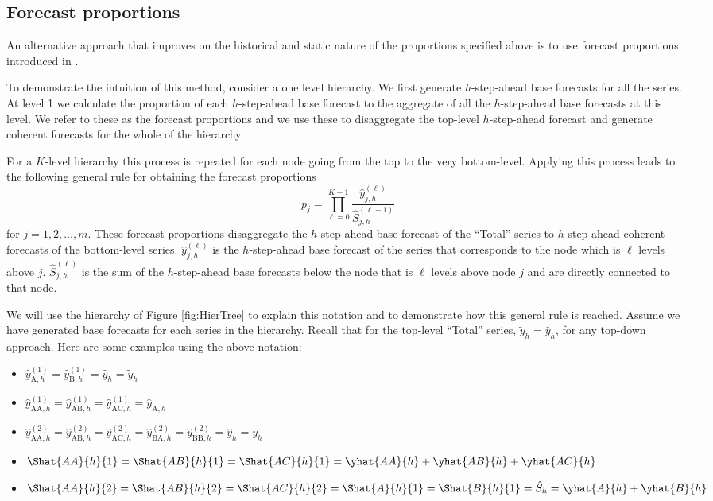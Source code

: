\documentclass[]{book}
\providecommand{\tightlist}{%
  \setlength{\itemsep}{0pt}\setlength{\parskip}{0pt}}
\begin{document}
\hypertarget{forecast-proportions}{%
\subsection*{Forecast proportions}\label{forecast-proportions}}

An alternative approach that improves on the historical and static nature of the proportions specified above is to use forecast proportions introduced in \citet{AthEtAl2009}.

To demonstrate the intuition of this method, consider a one level hierarchy. We first generate \(h\)-step-ahead base forecasts for all the series. At level 1 we calculate the proportion of each \(h\)-step-ahead base forecast to the aggregate of all the \(h\)-step-ahead base forecasts at this level. We refer to these as the forecast proportions and we use these to disaggregate the top-level \(h\)-step-ahead forecast and generate coherent forecasts for the whole of the hierarchy.

For a \(K\)-level hierarchy this process is repeated for each node going from the top to the very bottom-level. Applying this process leads to the following general rule for obtaining the forecast proportions
\[
  p_j=\prod^{K-1}_{\ell=0}\frac{\hat{y}_{j,h}^{(\ell)}}{\hat{S}_{j,h}^{(\ell+1)}}
\]
for \(j=1,2,\dots,m\). These forecast proportions disaggregate the \(h\)-step-ahead base forecast of the ``Total'' series to \(h\)-step-ahead coherent forecasts of the bottom-level series. \(\hat{y}_{j,h}^{(\ell)}\) is the \(h\)-step-ahead base forecast of the series that corresponds to the node which is \(\ell\) levels above \(j\). \(\hat{S}_{j,h}^{(\ell)}\) is the sum of the \(h\)-step-ahead base forecasts below the node that is \(\ell\) levels above node \(j\) and are directly connected to that node.

We will use the hierarchy of Figure \ref{fig:HierTree} to explain this notation and to demonstrate how this general rule is reached. Assume we have generated base forecasts for each series in the hierarchy. Recall that for the top-level ``Total'' series, \(\tilde{y}_{h}=\hat{y}_{h}\), for any top-down approach. Here are some examples using the above notation:

\begin{itemize}
\tightlist
\item
  \(\hat{y}_{\text{A},h}^{(1)}=\hat{y}_{\text{B},h}^{(1)}=\hat{y}_{h}= \tilde{y}_{h}\)
\item
  \(\hat{y}_{\text{AA},h}^{(1)}=\hat{y}_{\text{AB},h}^{(1)}=\hat{y}_{\text{AC},h}^{(1)}= \hat{y}_{\text{A},h}\)
\item
  \(\hat{y}_{\text{AA},h}^{(2)}=\hat{y}_{\text{AB},h}^{(2)}= \hat{y}_{\text{AC},h}^{(2)}=\hat{y}_{\text{BA},h}^{(2)}= \hat{y}_{\text{BB},h}^{(2)}=\hat{y}_{h}= \tilde{y}_{h}\)
\item
  \(\Shat{AA}{h}{1} = \Shat{AB}{h}{1}= \Shat{AC}{h}{1}= \yhat{AA}{h}+\yhat{AB}{h}+\yhat{AC}{h}\)
\item
  \(\Shat{AA}{h}{2} = \Shat{AB}{h}{2}= \Shat{AC}{h}{2}= \Shat{A}{h}{1} = \Shat{B}{h}{1}= \hat{S}_{h}= \yhat{A}{h}+\yhat{B}{h}\)
\end{itemize}
\end{document}
